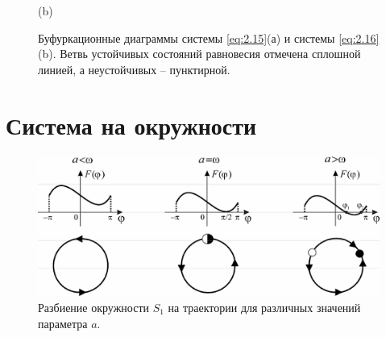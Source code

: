 \begin{figure}[h!]
\begin{minipage}{0.45\linewidth}
            (b)
    \end{minipage}
        \caption{Буфуркационные диаграммы системы \eqref{eq:2.15}(а) и системы \eqref{eq:2.16}(b).
    Ветвь устойчивых состояний равновесия отмечена сплошной линией, а неустойчивых -- пунктирной.}
    \label{fig:2.10}
\end{figure}
\section{Система на окружности}%
\begin{figure}[h]
        \centering
        \includegraphics[width=\linewidth]{fig/lect2/11}
        \caption{Разбиение окружности $S_1$ на траектории для различных значений параметра $a$.}
        \label{fig:2.11}
\end{figure}

